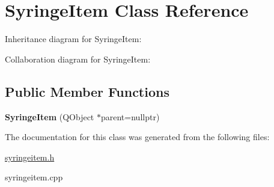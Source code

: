 \hypertarget{classSyringeItem}{}\section{Syringe\+Item Class Reference}
\label{classSyringeItem}


Inheritance diagram for Syringe\+Item\+:


Collaboration diagram for Syringe\+Item\+:
\subsection*{Public Member Functions}
\begin{DoxyCompactItemize}
\item 
\mbox{\label{classSyringeItem_aa9f65e95536f7c83923c580cd9a00152}} 
{\bfseries Syringe\+Item} (Q\+Object $\ast$parent=nullptr)
\end{DoxyCompactItemize}


The documentation for this class was generated from the following files\+:\begin{DoxyCompactItemize}
\item 
\hyperlink{syringeitem_8h}{syringeitem.\+h}\item 
syringeitem.\+cpp\end{DoxyCompactItemize}
